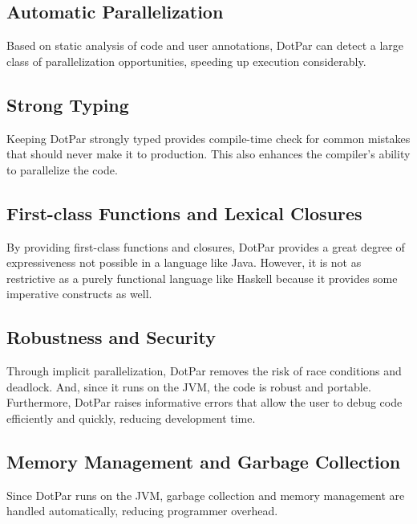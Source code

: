 \subsection{Automatic Parallelization}
Based on static analysis of code and user annotations, DotPar can
detect a large class of parallelization opportunities, speeding up
execution considerably.

\subsection{Strong Typing}
Keeping DotPar strongly typed provides compile-time
check for common mistakes that should never make it to
production. This also enhances the compiler’s ability to parallelize
the code.

\subsection{First-class Functions and Lexical Closures}
By providing first-class functions and closures, DotPar provides a
great degree of expressiveness not possible in a language like
Java. However, it is not as restrictive as a purely functional
language like Haskell because it provides some imperative constructs
as well.

\subsection{Robustness and Security}
Through implicit parallelization, DotPar removes the risk of race
conditions and deadlock.  And, since it runs on the JVM, the code is
robust and portable. Furthermore, DotPar raises informative
errors that allow the user to debug code efficiently and quickly,
reducing development time.

\subsection{Memory Management and Garbage Collection}
Since DotPar runs on the JVM, garbage collection and memory management
are handled automatically, reducing programmer overhead.
